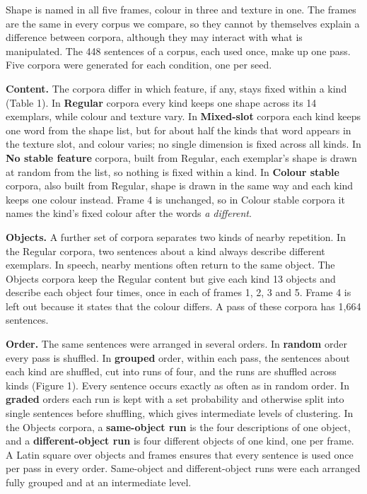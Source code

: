 Shape is named in all five frames, colour in three and texture in one. The frames are the same in every corpus we compare, so they cannot by themselves explain a difference between corpora, although they may interact with what is manipulated. The 448 sentences of a corpus, each used once, make up one pass. Five corpora were generated for each condition, one per seed.

\textbf{Content.} The corpora differ in which feature, if any, stays fixed within a kind (Table 1). In \textbf{Regular} corpora every kind keeps one shape across its 14 exemplars, while colour and texture vary. In \textbf{Mixed-slot} corpora each kind keeps one word from the shape list, but for about half the kinds that word appears in the texture slot, and colour varies; no single dimension is fixed across all kinds. In \textbf{No stable feature} corpora, built from Regular, each exemplar's shape is drawn at random from the list, so nothing is fixed within a kind. In \textbf{Colour stable} corpora, also built from Regular, shape is drawn in the same way and each kind keeps one colour instead. Frame 4 is unchanged, so in Colour stable corpora it names the kind's fixed colour after the words \emph{a different}.

\textbf{Objects.} A further set of corpora separates two kinds of nearby repetition. In the Regular corpora, two sentences about a kind always describe different exemplars. In speech, nearby mentions often return to the same object. The Objects corpora keep the Regular content but give each kind 13 objects and describe each object four times, once in each of frames 1, 2, 3 and 5. Frame 4 is left out because it states that the colour differs. A pass of these corpora has 1,664 sentences.

\textbf{Order.} The same sentences were arranged in several orders. In \textbf{random} order every pass is shuffled. In \textbf{grouped} order, within each pass, the sentences about each kind are shuffled, cut into runs of four, and the runs are shuffled across kinds (Figure 1). Every sentence occurs exactly as often as in random order. In \textbf{graded} orders each run is kept with a set probability and otherwise split into single sentences before shuffling, which gives intermediate levels of clustering. In the Objects corpora, a \textbf{same-object run} is the four descriptions of one object, and a \textbf{different-object run} is four different objects of one kind, one per frame. A Latin square over objects and frames ensures that every sentence is used once per pass in every order. Same-object and different-object runs were each arranged fully grouped and at an intermediate level.

